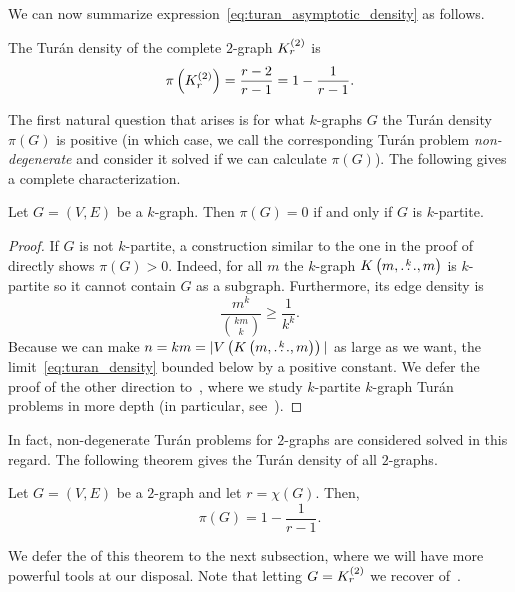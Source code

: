 We can now summarize expression~\eqref{eq:turan_asymptotic_density} as follows.
\begin{corollary} \label{cor:turan_density_kr}
    The Turán density of the complete $2$-graph $K^{(2)}_{r}$ is
    \[
        \pi\left(K^{(2)}_{r}\right) = \frac{r-2}{r-1} = 1 - \frac{1}{r-1}.
    \]
\end{corollary}

The first natural question that arises is for what $k$-graphs $G$ the Turán density $\pi(G)$ is positive
(in which case, we call the corresponding Turán problem \emph{non-degenerate}
and consider it solved if we can calculate $\pi(G)$).
The following gives a complete characterization.

\begin{proposition} \label{prop:degenerate}
    Let $G = (V, E)$ be a $k$-graph.
    Then $\pi(G) = 0$ if and only if $G$ is $k$-partite.
    \begin{proof}
        If $G$ is not $k$-partite, a construction similar to the one in the proof of~
        directly shows $\pi (G) > 0$.
        Indeed, for all $m$ the $k$-graph $K\left(m, \overset{k}{\dots}, m\right)$ is $k$-partite so it cannot contain $G$ as a subgraph.
        Furthermore, its edge density is
        \[
             \frac{m^k}{\binom{km}{k}} \geq \frac{1}{k^k}.
        \]
        Because we can make $n = km = |V\left( K\left(m, \overset{k}{\dots}, m\right) \right)|$ as large as we want,
        the limit~\eqref{eq:turan_density} bounded below by a positive constant.
        We defer the proof of the other direction to~,
        where we study $k$-partite $k$-graph Turán problems
        in more depth (in particular, see~).
    \end{proof}
\end{proposition}

In fact, non-degenerate Turán problems for $2$-graphs are considered solved in this regard.
The following theorem gives the Turán density of all $2$-graphs.

\begin{theorem}
    \label{thm:erdos_stone_simonovits}
    Let $G = (V, E)$ be a $2$-graph and let $r = \chi(G)$.
    Then,
    \[
        \pi(G) = 1 - \frac{1}{r - 1}.
    \]
\end{theorem}

We defer the  of this theorem to the next subsection,
where we will have more powerful tools at our disposal.
Note that letting $G = K^{(2)}_{r}$ we recover
 of~.

